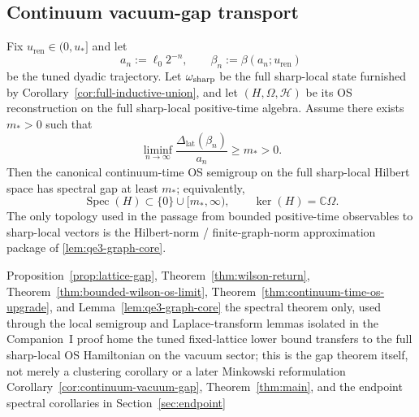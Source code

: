 \subsection{Continuum vacuum-gap transport}

\begin{theorem}\label{thm:continuum-gap-transport}
Fix $u_{\mathrm{ren}}\in(0,u_*]$ and let
\[
a_n:=\ell_0 2^{-n},\qquad \beta_n:=\beta(a_n;u_{\mathrm{ren}})
\]
be the tuned dyadic trajectory. Let $\omega_{\mathrm{sharp}}$ be the full sharp-local state furnished by Corollary~\ref{cor:full-inductive-union}, and let $(H,\Omega,\mathcal H)$ be its OS reconstruction on the full sharp-local positive-time algebra. Assume there exists $m_*>0$ such that
\[
\liminf_{n\to\infty}\frac{\Delta_{\mathrm{lat}}(\beta_n)}{a_n}\ge m_*>0.
\]
Then the canonical continuum-time OS semigroup on the full sharp-local Hilbert space has spectral gap at least $m_*$; equivalently,
\[
\operatorname{Spec}(H)\subset \{0\}\cup [m_*,\infty),
\qquad
\ker(H)=\mathbb C\Omega.
\]
The only topology used in the passage from bounded positive-time observables to sharp-local vectors is the Hilbert-norm / finite-graph-norm approximation package of \cref{lem:qe3-graph-core}.
\end{theorem}

\dependencyledger
  {Proposition~\ref{prop:lattice-gap}, Theorem~\ref{thm:wilson-return}, Theorem~\ref{thm:bounded-wilson-os-limit}, Theorem~\ref{thm:continuum-time-os-upgrade}, and Lemma~\ref{lem:qe3-graph-core}}
  {the spectral theorem only, used through the local semigroup and Laplace-transform lemmas isolated in the Companion~I proof home}
  {the tuned fixed-lattice lower bound transfers to the full sharp-local OS Hamiltonian on the vacuum sector; this is the gap theorem itself, not merely a clustering corollary or a later Minkowski reformulation}
  {Corollary~\ref{cor:continuum-vacuum-gap}, Theorem~\ref{thm:main}, and the endpoint spectral corollaries in Section~\ref{sec:endpoint}}

